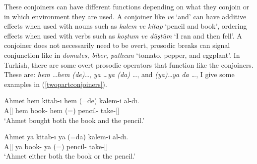 These conjoiners can have different functions depending on what they conjoin or in which environment they are used. A conjoiner like \textit{ve} `and' can have additive effects when used with nouns such as \textit{kalem ve kitap} `pencil and book', ordering effects when used with verbs such as \textit{koştum ve düştüm} `I ran and then fell'. A conjoiner does not necessarily need to be overt, prosodic breaks can signal conjunction like in \textit{domates, biber, patlıcan} `tomato, pepper, and eggplant'. In Turkish, there are some overt prosodic operators that function like the conjoiners. These are: \textit{hem \ldots hem (de)\ldots}, \textit{ya \ldots ya (da) \ldots}, and \textit{(ya)\ldots ya da \ldots}, I give some examples in (\ref{twopartconjoiners}).

\begin{exe}
    \ex \label{twopartconjoiners}
    \begin{xlist}
    \ex \gll Ahmet hem kitab-ı hem (=de) kalem-i al-dı. \\ 
    A[{\Nom}] hem book-{\Acc} hem (={\Foc}) pencil-{\Acc} take-{\Pst}[{\Tsg}] \\
    \glt `Ahmet bought both the book and the pencil.'
    
    \ex \gll Ahmet ya kitab-ı ya (=da) kalem-i al-dı. \\ 
    A[{\Nom}] ya book-{\Acc} ya (={\Foc}) pencil-{\Acc} take-{\Pst}[{\Tsg}] \\
    \glt `Ahmet either both the book or the pencil.'
    \end{xlist}
\end{exe}

 
 
 
 